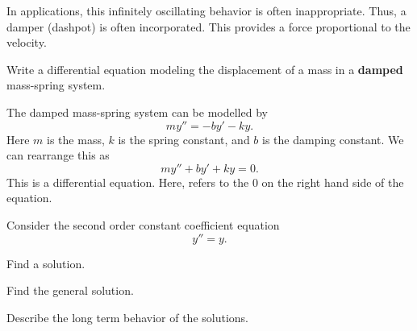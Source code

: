 \begin{applicationActivities}
\begin{activity}{5}
In applications, this infinitely oscillating behavior is often inappropriate.
\vfill
Thus, a damper (dashpot) is often incorporated.  This provides a force proportional to the velocity.
\begin{center}
\springmassdamper
\end{center}
\vfill
Write a differential equation modeling the displacement of a mass in a \textbf{damped} mass-spring system.
\vfill
\end{activity}

\begin{observation}
The damped mass-spring system can be modelled by
\[my''=-by'-ky.\]
Here \(m\) is the mass, \(k\) is the spring constant, and \(b\) is the damping constant.  We can rearrange this as
\[my''+by'+ky=0.\]
\vfill
This is a   differential equation.
Here,  refers to the \(0\) on the right hand side of the equation.
\end{observation}

\begin{activity}{15}
Consider the second order constant coefficient equation \[y''=y.\]
\begin{subactivity}
Find a solution.
\end{subactivity}
\begin{subactivity}
Find the general solution.
\end{subactivity}
\begin{subactivity}
Describe the long term behavior of the solutions.
\end{subactivity}
\end{activity}




\end{applicationActivities}
